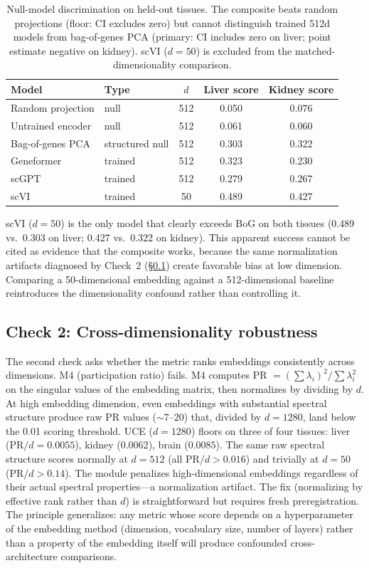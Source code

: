 \documentclass[9pt,lineno]{elife}
\begin{document}
\begin{table}[t]
\centering
\caption{Null-model discrimination on held-out tissues. The composite beats random projections (floor: CI excludes zero) but cannot distinguish trained 512d models from bag-of-genes PCA (primary: CI includes zero on liver; point estimate negative on kidney). scVI ($d = 50$) is excluded from the matched-dimensionality comparison.}
\label{tab:v6b}
\small
\begin{tabular}{@{}llccc@{}}
\toprule
Model & Type & $d$ & Liver score & Kidney score \\
\midrule
Random projection & null & 512 & 0.050 & 0.076 \\
Untrained encoder & null & 512 & 0.061 & 0.060 \\
\midrule
Bag-of-genes PCA & structured null & 512 & 0.303 & 0.322 \\
\midrule
Geneformer & trained & 512 & 0.323 & 0.230 \\
scGPT & trained & 512 & 0.279 & 0.267 \\
scVI & trained & 50 & 0.489 & 0.427 \\
\bottomrule
\end{tabular}
\end{table}

scVI ($d = 50$) is the only model that clearly exceeds BoG on both tissues (0.489 vs.\ 0.303 on liver; 0.427 vs.\ 0.322 on kidney). This apparent success cannot be cited as evidence that the composite works, because the same normalization artifacts diagnosed by Check~2 (\S\ref{sec:check2}) create favorable bias at low dimension. Comparing a 50-dimensional embedding against a 512-dimensional baseline reintroduces the dimensionality confound rather than controlling it.

\subsection{Check 2: Cross-dimensionality robustness}
\label{sec:check2}

The second check asks whether the metric ranks embeddings consistently across dimensions. M4 (participation ratio) fails. M4 computes PR $= (\sum \lambda_i)^2 / \sum \lambda_i^2$ on the singular values of the embedding matrix, then normalizes by dividing by $d$. At high embedding dimension, even embeddings with substantial spectral structure produce raw PR values ($\sim 7$--$20$) that, divided by $d = 1280$, land below the 0.01 scoring threshold. UCE ($d = 1280$) floors on three of four tissues: liver (PR$/d = 0.0055$), kidney ($0.0062$), brain ($0.0085$). The same raw spectral structure scores normally at $d = 512$ (all PR$/d > 0.016$) and trivially at $d = 50$ (PR$/d > 0.14$). The module penalizes high-dimensional embeddings regardless of their actual spectral properties---a normalization artifact. The fix (normalizing by effective rank rather than $d$) is straightforward but requires fresh preregistration. The principle generalizes: any metric whose score depends on a hyperparameter of the embedding method (dimension, vocabulary size, number of layers) rather than a property of the embedding itself will produce confounded cross-architecture comparisons.
\end{document}
